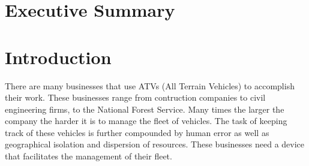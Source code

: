 \documentclass[11pt]{article}
\begin{document}
% 
%
%


\thispagestyle{empty}
\setcounter{tocdepth}{5}
\tableofcontents
\vspace{2cm}

\thispagestyle{empty}
\listoffigures
\pagebreak


\section{Executive Summary}

\section{Introduction}
There are many businesses that use ATVs (All Terrain Vehicles) to accomplish their work. These businesses range from contruction companies to civil
engineering firms, to the National Forest Service. Many times the larger the company the harder it is to manage the fleet of vehicles. The task of
keeping track of these vehicles is further compounded by human error as well as geographical isolation and dispersion of resources. These businesses
need a device that facilitates the management of their fleet. 
\end{document}
